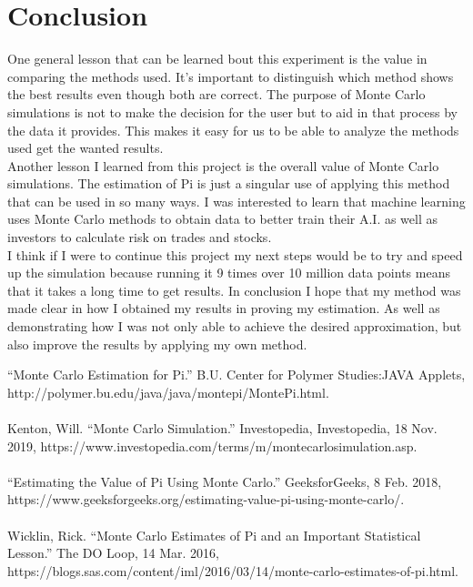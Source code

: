 \documentclass{llncs}
\begin{document}
\section{Conclusion}One general lesson that can be learned bout this experiment is the value in comparing the methods used. It’s important to distinguish which method shows the best results even though both are correct. The purpose of Monte Carlo simulations is not to make the decision for the user but to aid in that process by the data it provides. This makes it easy for us to be able to analyze the methods used get the wanted results.\\
Another lesson I learned from this project is the overall value of Monte Carlo simulations. The estimation of Pi is just a singular use of applying this method that can be used in so many ways. I was interested to learn that machine learning uses Monte Carlo methods to obtain data to better train their A.I. as well as investors to calculate risk on trades and stocks.\\
I think if I were to continue this project my next steps would be to try and speed up the simulation because running it 9 times over 10 million data points means that it takes a long time to get results. In conclusion I hope that my method was made clear in how I obtained my results in proving my estimation. As well as demonstrating how I was not only able to achieve the desired approximation, but also improve the results by applying my own method. 




“Monte Carlo Estimation for Pi.” B.U. Center for Polymer Studies:JAVA Applets, http://polymer.bu.edu/java/java/montepi/MontePi.html.\\
\\Kenton, Will. “Monte Carlo Simulation.” Investopedia, Investopedia, 18 Nov. 2019, https://www.investopedia.com/terms/m/montecarlosimulation.asp.\\
\\“Estimating the Value of Pi Using Monte Carlo.” GeeksforGeeks, 8 Feb. 2018, https://www.geeksforgeeks.org/estimating-value-pi-using-monte-carlo/.\\
\\Wicklin, Rick. “Monte Carlo Estimates of Pi and an Important Statistical Lesson.” The DO Loop, 14 Mar. 2016, https://blogs.sas.com/content/iml/2016/03/14/monte-carlo-estimates-of-pi.html.
\end{document}

